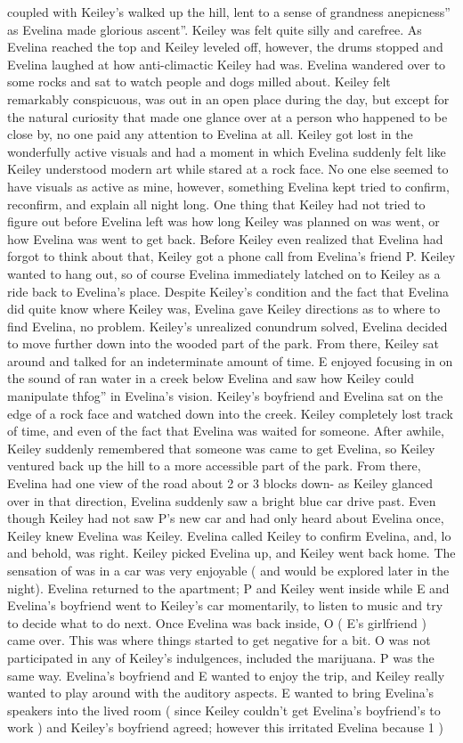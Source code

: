 \documentclass[12pt]{book}
\begin{document}
coupled with Keiley's walked up the hill, lent to a sense of grandness anepicness'' as Evelina made glorious ascent''. Keiley was felt quite silly and carefree. As Evelina reached the top and Keiley leveled off, however, the drums stopped and Evelina laughed at how anti-climactic Keiley had was. Evelina wandered over to some rocks and sat to watch people and dogs milled about. Keiley felt remarkably conspicuous, was out in an open place during the day, but except for the natural curiosity that made one glance over at a person who happened to be close by, no one paid any attention to Evelina at all. Keiley got lost in the wonderfully active visuals and had a moment in which Evelina suddenly felt like Keiley understood modern art while stared at a rock face. No one else seemed to have visuals as active as mine, however, something Evelina kept tried to confirm, reconfirm, and explain all night long. One thing that Keiley had not tried to figure out before Evelina left was how long Keiley was planned on was went, or how Evelina was went to get back. Before Keiley even realized that Evelina had forgot to think about that, Keiley got a phone call from Evelina's friend P. Keiley wanted to hang out, so of course Evelina immediately latched on to Keiley as a ride back to Evelina's place. Despite Keiley's condition and the fact that Evelina did quite know where Keiley was, Evelina gave Keiley directions as to where to find Evelina, no problem. Keiley's unrealized conundrum solved, Evelina decided to move further down into the wooded part of the park. From there, Keiley sat around and talked for an indeterminate amount of time. E enjoyed focusing in on the sound of ran water in a creek below Evelina and saw how Keiley could manipulate thfog'' in Evelina's vision. Keiley's boyfriend and Evelina sat on the edge of a rock face and watched down into the creek. Keiley completely lost track of time, and even of the fact that Evelina was waited for someone. After awhile, Keiley suddenly remembered that someone was came to get Evelina, so Keiley ventured back up the hill to a more accessible part of the park. From there, Evelina had one view of the road about 2 or 3 blocks down- as Keiley glanced over in that direction, Evelina suddenly saw a bright blue car drive past. Even though Keiley had not saw P's new car and had only heard about Evelina once, Keiley knew Evelina was Keiley. Evelina called Keiley to confirm Evelina, and, lo and behold, was right. Keiley picked Evelina up, and Keiley went back home. The sensation of was in a car was very enjoyable ( and would be explored later in the night). Evelina returned to the apartment; P and Keiley went inside while E and Evelina's boyfriend went to Keiley's car momentarily, to listen to music and try to decide what to do next. Once Evelina was back inside, O ( E's girlfriend ) came over. This was where things started to get negative for a bit. O was not participated in any of Keiley's indulgences, included the marijuana. P was the same way. Evelina's boyfriend and E wanted to enjoy the trip, and Keiley really wanted to play around with the auditory aspects. E wanted to bring Evelina's speakers into the lived room ( since Keiley couldn't get Evelina's boyfriend's to work ) and Keiley's boyfriend agreed; however this irritated Evelina because 1 ) 
\end{document}
